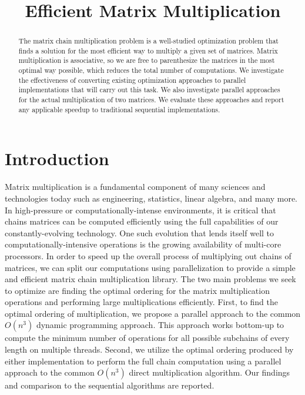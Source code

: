 \documentclass[conference,leqno]{IEEEtran}
\begin{document}
\title{Efficient Matrix Multiplication}

\author{
\and
{}
\and
{}
\and
{}
\and
{}
}

\maketitle

\begin{abstract}
The matrix chain multiplication problem is a well-studied optimization problem that finds a solution for the most efficient way to multiply a given set of matrices. Matrix multiplication is associative, so we are free to parenthesize the matrices in the most optimal way possible, which reduces the total number of computations. We investigate the effectiveness of converting existing optimization approaches to parallel implementations that will carry out this task. We also investigate parallel approaches for the actual multiplication of two matrices. We evaluate these approaches and report any applicable speedup to traditional sequential implementations.
\end{abstract}

\section{Introduction}
Matrix multiplication is a fundamental component of many sciences and technologies today such as engineering, statistics, linear algebra, and many more. In high-pressure or computationally-intense environments, it is critical that chains matrices can be computed efficiently using the full capabilities of our constantly-evolving technology. One such evolution that lends itself well to computationally-intensive operations is the growing availability of multi-core processors. In order to speed up the overall process of multiplying out chains of matrices, we can split our computations using parallelization to provide a simple and efficient matrix chain multiplication library.
The two main problems we seek to optimize are finding the optimal ordering for the matrix multiplication operations and performing large multiplications efficiently. First, to find the optimal ordering of multiplication, we propose a parallel approach to the common $O(n^3)$ dynamic programming approach. This approach works bottom-up to compute the minimum number of operations for all possible subchains of every length on multiple threads. Second, we utilize the optimal ordering produced by either implementation to perform the full chain computation using a parallel approach to the common $O(n^3)$ direct multiplication algorithm. Our findings and comparison to the sequential algorithms are reported.
\end{document}
